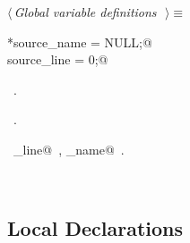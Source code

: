 \documentclass{report}
\begin{document}
\begin{flushleft} \small
\begin{minipage}{\linewidth} \label{scrap136}
$\langle\,${\it Global variable definitions}\nobreak\ {\footnotesize {}}$\,\rangle\equiv$
\vspace{-1ex}
\begin{list}{}{} \item
\mbox{}\verb@char *source_name = NULL;@\\
\mbox{}\verb@int source_line = 0;@\\
\mbox{}\verb@@{\NWsep}
\end{list}
\vspace{-1ex}
\footnotesize\addtolength{\baselineskip}{-1ex}
\begin{list}{}{\setlength{\itemsep}{-\parsep}\setlength{\itemindent}{-\leftmargin}}
\item \NWtxtMacroDefBy\ .
\item \NWtxtMacroRefIn\ .
\end{list}
\vspace{-2ex}
\footnotesize\addtolength{\baselineskip}{-1ex}
\begin{list}{}{\setlength{\itemsep}{-\parsep}\setlength{\itemindent}{-\leftmargin}}
\item \NWtxtIdentsUsed\nobreak\  \verb@source_line@\nobreak\ , \verb@source_name@\nobreak\ .\end{list}
\end{minipage}\\[4ex]
\end{flushleft}
\subsection{Local Declarations}
\end{document}
